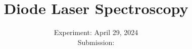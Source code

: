 

\subject{\texorpdfstring{\vspace{2ex}}{}V60\texorpdfstring{\vspace{-2ex}}{}} %
\title{Diode Laser Spectroscopy} %
\date{
	Experiment: April 29, 2024 %
	\\ Submission:  %
}




\maketitle
\thispagestyle{empty}


\tableofcontents
\newpage








\enlargethispage{2\baselineskip}\printbibliography{}\pagebreak

\newpage



